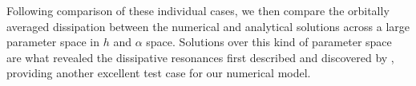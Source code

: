 Following comparison of these individual cases, we then compare the orbitally averaged dissipation between the numerical and analytical solutions across a large parameter space in $h$ and $\alpha$ space. Solutions over this kind of parameter space are what revealed the dissipative resonances first described and discovered by \citet{tyler2011tidal}, providing another excellent test case for our numerical model.

